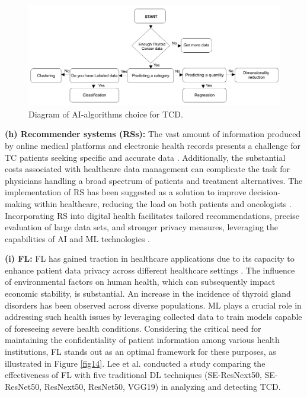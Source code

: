 \documentclass[a4paper,fleqn]{cas-sc}
\begin{document}
\begin{figure}[t!]
\centering
\includegraphics[width=1\columnwidth]{fig13}
\caption{Diagram of \ac{AI}-algorithms choice for \ac{TCD}. }
\label{fig13}
\end{figure}


\vskip2mm
\noindent \textbf{(h) Recommender systems (RSs): } The vast amount of information produced by online medical platforms and electronic health records presents a challenge for TC patients seeking specific and accurate data \cite{himeur2021survey}. Additionally, the substantial costs associated with healthcare data management can complicate the task for physicians handling a broad spectrum of patients and treatment alternatives. The implementation of RS has been suggested as a solution to improve decision-making within healthcare, reducing the load on both patients and oncologists \cite{areeb2023filter, varlamis2022smart}. Incorporating RS into digital health facilitates tailored recommendations, precise evaluation of large data sets, and stronger privacy measures, leveraging the capabilities of AI and ML technologies \cite{atalla2023intelligent}.



\vskip2mm
\noindent \textbf{(i) \Ac{FL}:} \acs{FL} has gained traction in healthcare applications due to its capacity to enhance patient data privacy across different healthcare settings \cite{antunes2022federated,himeur2023federated}. The influence of environmental factors on human health, which can subsequently impact economic stability, is substantial. An increase in the incidence of thyroid gland disorders has been observed across diverse populations. \ac{ML} plays a crucial role in addressing such health issues by leveraging collected data to train models capable of foreseeing severe health conditions. Considering the critical need for maintaining the confidentiality of patient information among various health institutions, \ac{FL} stands out as an optimal framework for these purposes, as illustrated in Figure \ref{fig14}. Lee et al. \cite{lee2021federated} conducted a study comparing the effectiveness of FL with five traditional DL techniques (SE-ResNext50, SE-ResNet50, ResNext50, ResNet50, VGG19) in analyzing and detecting \ac{TCD}.
\end{document}
